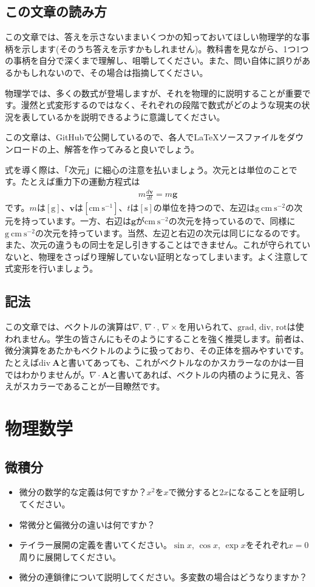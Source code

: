 \documentclass{ltjarticle}
\begin{document}
\subsection{この文章の読み方}
この文章では、答えを示さないままいくつかの知っておいてほしい物理学的な事柄を示します(そのうち答えを示すかもしれません)。教科書を見ながら、1つ1つの事柄を自分で深くまで理解し、咀嚼してください。また、問い自体に誤りがあるかもしれないので、その場合は指摘してください。\par
物理学では、多くの数式が登場しますが、それを物理的に説明することが重要です。漫然と式変形するのではなく、それぞれの段階で数式がどのような現実の状況を表しているかを説明できるように意識してください。\par
この文章は、GitHubで公開しているので、各人で\LaTeX ソースファイルをダウンロードの上、解答を作ってみると良いでしょう。
\par
式を導く際は、「次元」に細心の注意を払いましょう。次元とは単位のことです。たとえば重力下の運動方程式は
\begin{align}
    m\frac{d\bm{v}}{dt} = m \bm{g}
\end{align}
です。$m$は$\mathrm{[g]}$、$\bm{v}$は$\mathrm{[cm~s^{-1}]}$、$t$は$\mathrm{[s]}$の単位を持つので、左辺は$\mathrm{g~cm~s^{-2}}$の次元を持っています。一方、右辺は$\bm{g}$が$\mathrm{cm~s^{-2}}$の次元を持っているので、同様に$\mathrm{g~cm~s^{-2}}$の次元を持っています。当然、左辺と右辺の次元は同じになるのです。また、次元の違うもの同士を足し引きすることはできません。これが守られていないと、物理をさっぱり理解していない証明となってしまいます。よく注意して式変形を行いましょう。
\subsection{記法}
この文章では、ベクトルの演算は$\nabla$, $\nabla\cdot$, $\nabla\times$を用いられて、$\mathrm{grad}$, $\mathrm{div}$, $\mathrm{rot}$は使われません。学生の皆さんにもそのようにすることを強く推奨します。前者は、微分演算をあたかもベクトルのように扱っており、その正体を掴みやすいです。たとえば$\mathrm{div}~\bm{A}$と書いてあっても、これがベクトルなのかスカラーなのかは一目ではわかりませんが。$\nabla\cdot\bm{A}$と書いてあれば、ベクトルの内積のように見え、答えがスカラーであることが一目瞭然です。

\section{物理数学}
\subsection{微積分}
\begin{itemize}
    \item 微分の数学的な定義は何ですか？$x^2$を$x$で微分すると$2x$になることを証明してください。
    \item 常微分と偏微分の違いは何ですか？
    \item テイラー展開の定義を書いてください。$\sin x$, $\cos x$, $\exp x$をそれぞれ$x=0$周りに展開してください。
    \item 微分の連鎖律について説明してください。多変数の場合はどうなりますか？
\end{itemize}
\end{document}
